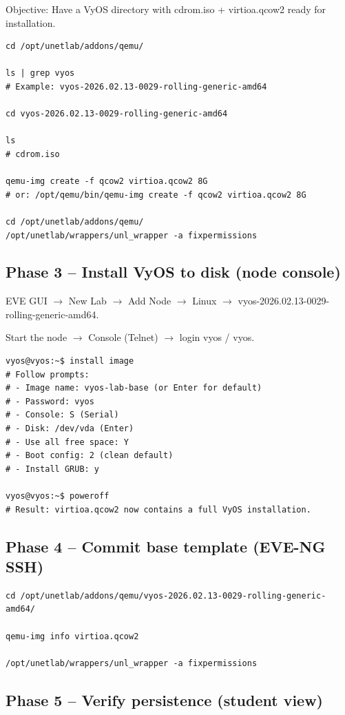 Objective: Have a VyOS directory with cdrom.iso + virtioa.qcow2 ready for installation.

\begin{lstlisting}
cd /opt/unetlab/addons/qemu/

ls | grep vyos
# Example: vyos-2026.02.13-0029-rolling-generic-amd64

cd vyos-2026.02.13-0029-rolling-generic-amd64

ls
# cdrom.iso

qemu-img create -f qcow2 virtioa.qcow2 8G
# or: /opt/qemu/bin/qemu-img create -f qcow2 virtioa.qcow2 8G

cd /opt/unetlab/addons/qemu/
/opt/unetlab/wrappers/unl_wrapper -a fixpermissions
\end{lstlisting}

\subsection{Phase 3 -- Install VyOS to disk (node console)}

EVE GUI $\rightarrow$ New Lab $\rightarrow$ Add Node $\rightarrow$ Linux $\rightarrow$ vyos-2026.02.13-0029-rolling-generic-amd64.

Start the node $\rightarrow$ Console (Telnet) $\rightarrow$ login vyos / vyos.

\begin{lstlisting}
vyos@vyos:~$ install image
# Follow prompts:
# - Image name: vyos-lab-base (or Enter for default)
# - Password: vyos
# - Console: S (Serial)
# - Disk: /dev/vda (Enter)
# - Use all free space: Y
# - Boot config: 2 (clean default)
# - Install GRUB: y

vyos@vyos:~$ poweroff
# Result: virtioa.qcow2 now contains a full VyOS installation.
\end{lstlisting}

\subsection{Phase 4 -- Commit base template (EVE-NG SSH)}

\begin{lstlisting}
cd /opt/unetlab/addons/qemu/vyos-2026.02.13-0029-rolling-generic-amd64/

qemu-img info virtioa.qcow2

/opt/unetlab/wrappers/unl_wrapper -a fixpermissions
\end{lstlisting}

\subsection{Phase 5 -- Verify persistence (student view)}

